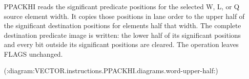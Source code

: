 PPACKHI reads the significant predicate positions for the selected W, L, or Q
source element width.  It copies those positions in lane order to the upper
half of the significant destination positions for elements half that width.
The complete destination predicate image is written: the lower half of its
significant positions and every bit outside its significant positions are cleared.  The operation
leaves FLAGS unchanged.

(:diagram:VECTOR.instructions.PPACKHI.diagrams.word-upper-half:)
